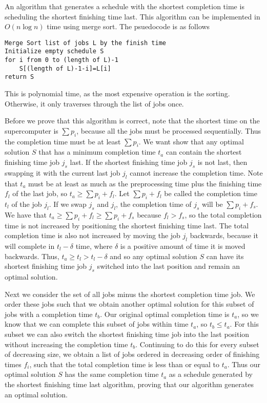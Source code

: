 \documentclass[12pt]{article}
\begin{document}
An algorithm that generates a schedule with the shortest completion time is scheduling the shortest finishing time last.
This algorithm can be implemented in \(O(n \log n)\) time using merge sort. The psuedocode is as follows

\begin{verbatim}
Merge Sort list of jobs L by the finish time
Initialize empty schedule S
for i from 0 to (length of L)-1
    S[(length of L)-1-i]=L[i]
return S
\end{verbatim}
This is polynomial time, as the most expensive operation is the sorting. Otherwise, it only traverses through the list of jobs once.

Before we prove that this algorithm is correct, note that the shortest time on the supercomputer is \(\sum p_i\), because all
the jobs must be processed sequentially. Thus the completion time must be at least \(\sum p_i\). We want show that any optimal solution
\(S\) that has a minimum completion time \(t_a\) can contain the shortest finishing time job \(j_s\) last. If the shortest finishing time
job \(j_s\) is not last, then swapping it with the current last job \(j_l\) cannot increase the completion time. Note that \(t_a\)
must be at least as much as the preprocessing time plus the finishing time \(f_l\) of the last job, so \(t_a\geq\sum p_i + f_l\). Let
\(\sum p_i + f_l\) be called the completion time \(t_l\) of the job \(j_l\). If we swap \(j_s\) and \(j_l\), the completion time of \(j_s\)
will be \(\sum p_i + f_s\). We have that \(t_a\geq\sum p_i + f_l\geq\sum p_i + f_s\) because \(f_l>f_s\), so the total completion time is not increased
by positioning the shortest finishing time last. The total completion time is also not increased by moving the job \(j_l\) backwards, because it will complete in \(t_l-\delta\) time, where \(\delta\) is a positive amount of time it is moved backwards. Thus, \(t_a\geq t_l>t_l-\delta\) and so any optimal solution \(S\) can
have its shortest finishing time job \(j_s\) switched into the last position and remain an optimal solution.

Next we consider the set of all jobs minus the shortest completion time job. We order these jobs such that we obtain another optimal solution
for this subset of jobs with a completion time \(t_b\). Our original optimal completion time is \(t_a\), so we know that we can complete this subset of
jobs within time \(t_a\), so \(t_b\leq t_a\). For this subset we can also switch the shortest finishing time job into the last position
without increasing the completion time \(t_b\). Continuing to do this for every subset of decreasing size, we obtain a list of jobs ordered in decreasing
order of finishing times \(f_i\), such that the total completion time is less than or equal to \(t_a\). Thus our optimal solution \(S\) has the same completion
time \(t_a\) as a schedule generated by the shortest finishing time last algorithm, proving that our algorithm generates an optimal solution.
\end{document}
